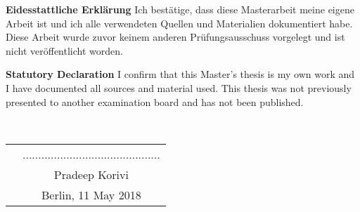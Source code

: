 \begin{titlepage}
\vspace*{4.0cm}

\noindent\textbf{Eidesstattliche Erkl{\"a}rung}\newline
Ich best{\"a}tige, dass diese Masterarbeit meine eigene Arbeit ist und ich alle verwendeten
Quellen und Materialien dokumentiert habe. Diese Arbeit wurde zuvor keinem
anderen Pr{\"u}fungsausschuss vorgelegt und ist nicht ver{\"o}ffentlicht worden.

\vspace*{4.0cm}


\noindent \textbf{Statutory Declaration}\newline
I confirm that this Master's thesis is my own work and I have documented all sources
and material used. This thesis was not previously presented to another examination
board and has not been published.

\vspace*{1cm}
~\\
\begin{flushright}

\begin{tabular}{lc}
      \vspace*{0.1cm}
       &  ............................................ \\
      \vspace*{0.1cm}
					      & \noindent \large{Pradeep Korivi}\\
	  \vspace*{0.1cm}
					      & \noindent \large{Berlin, 11 May 2018 }
\end{tabular}

\end{flushright}

\end{titlepage}
\sloppy

\titlepage


